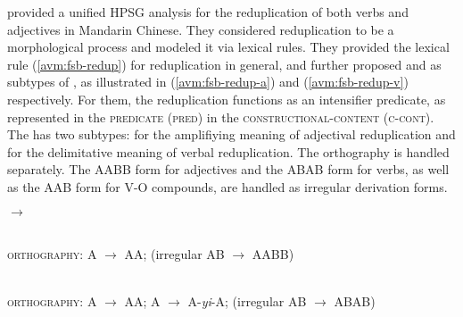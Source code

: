  
 
 
 
 
 
\citet{FanSongBond2015} provided a unified HPSG analysis for the reduplication of both verbs and adjectives in Mandarin Chinese.
They considered reduplication to be a morphological process and modeled it via lexical rules.
They provided the lexical rule (\ref{avm:fsb-redup}) for reduplication in general,
and further proposed  and  as subtypes of , 
as illustrated in (\ref{avm:fsb-redup-a}) and (\ref{avm:fsb-redup-v}) respectively.
For them, the reduplication functions as an intensifier predicate, as represented in the \textsc{predicate (pred)} in the \textsc{constructional-content (c-cont)}.
The  has two subtypes:  for the amplifiying meaning of adjectival reduplication and  for the delimitative meaning of verbal reduplication.
The orthography is handled separately.
The AABB form for adjectives and the ABAB form for verbs, as well as the AAB form for V-O compounds, are handled as irregular derivation forms.


\ea\label{avm:fsb-redup}
$\to$
\z


\ea\label{avm:fsb-redup-a}
\\
\textsc{orthography}: A $\to$ AA; (irregular AB $\to$ AABB)
\z

\ea\label{avm:fsb-redup-v}
\\
\textsc{orthography}: A $\to$ AA; A $\to$ A-\textit{yi}-A; (irregular AB $\to$ ABAB)
\z

